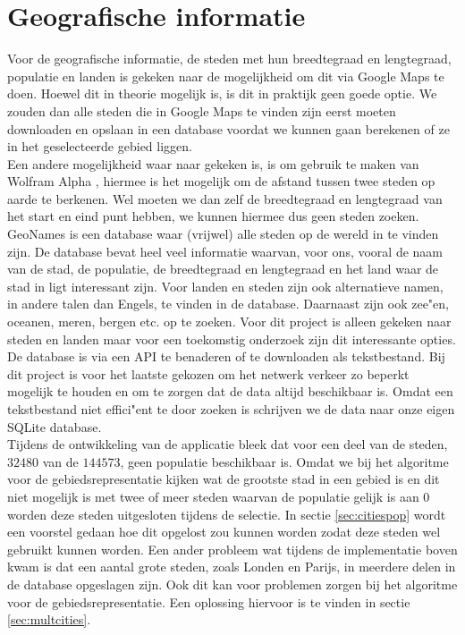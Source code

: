 \documentclass[twoside,openright]{uva-bachelor-thesis}
\begin{document}
	\section{Geografische informatie}
		\label{sec:geo_info}
		Voor de geografische informatie, de steden met hun breedtegraad en lengtegraad, populatie en landen is gekeken naar de mogelijkheid om dit via Google Maps \cite{MapsJS} te doen. Hoewel dit in theorie mogelijk is, is dit in praktijk geen goede optie. We zouden dan alle steden die in Google Maps te vinden zijn eerst moeten downloaden en opslaan in een database voordat we kunnen gaan berekenen of ze in het geselecteerde gebied liggen.
		\\[0.5cm]
		Een andere mogelijkheid waar naar gekeken is, is om gebruik te maken van Wolfram Alpha \cite{Wolf}, hiermee is het mogelijk om de afstand tussen twee steden op aarde te berkenen. Wel moeten we dan zelf de breedtegraad en lengtegraad van het start en eind punt hebben, we kunnen hiermee dus geen steden zoeken.
		\\[0.5cm]
		GeoNames \cite{Geonames} is een database waar (vrijwel) alle steden op de wereld in te vinden zijn. De database bevat heel veel informatie waarvan, voor ons, vooral de naam van de stad, de populatie, de breedtegraad en lengtegraad en het land waar de stad in ligt interessant zijn. Voor landen en steden zijn ook alternatieve namen, in andere talen dan Engels, te vinden in de database. Daarnaast zijn ook zee"en, oceanen, meren, bergen etc. op te zoeken. Voor dit project is alleen gekeken naar steden en landen maar voor een toekomstig onderzoek zijn dit interessante opties.
		\\[0.5cm]
		De database is via een API te benaderen of te downloaden als tekstbestand. Bij dit project is voor het laatste gekozen om het netwerk verkeer zo beperkt mogelijk te houden en om te zorgen dat de data altijd beschikbaar is. Omdat een tekstbestand niet effici"ent te door zoeken is schrijven we de data naar onze eigen SQLite database.
		\\[0.5cm]
		Tijdens de ontwikkeling van de applicatie bleek dat voor een deel van de steden, $32480$ van de $144573$, geen populatie beschikbaar is. Omdat we bij het algoritme voor de gebiedsrepresentatie kijken wat de grootste stad in een gebied is en dit niet mogelijk is met twee of meer steden waarvan de populatie gelijk is aan $0$ worden deze steden uitgesloten tijdens de selectie. In sectie \ref{sec:citiespop} wordt een voorstel gedaan hoe dit opgelost zou kunnen worden zodat deze steden wel gebruikt kunnen worden. Een ander probleem wat tijdens de implementatie boven kwam is dat een aantal grote steden, zoals Londen en Parijs, in meerdere delen in de database opgeslagen zijn. Ook dit kan voor problemen zorgen bij het algoritme voor de gebiedsrepresentatie. Een oplossing hiervoor is te vinden in sectie \ref{sec:multcities}.
\end{document}
